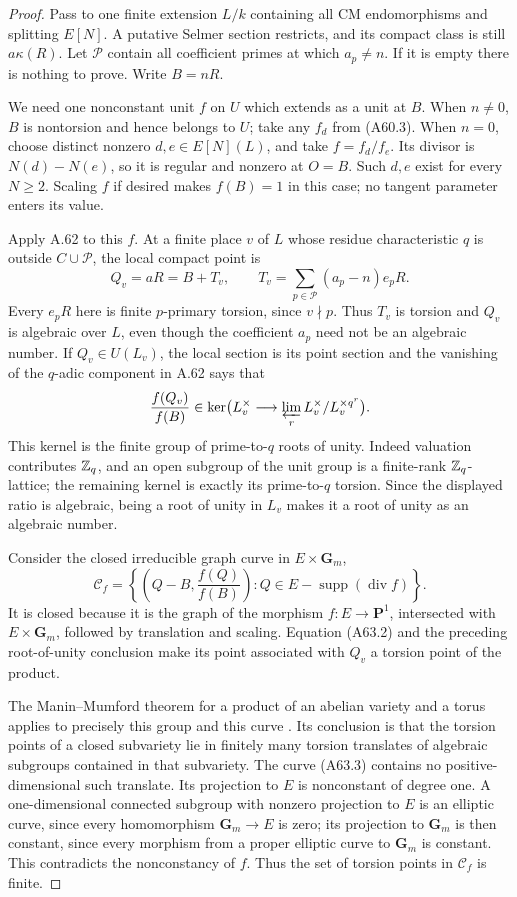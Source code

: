 \begin{proof}
Pass to one finite extension $L/k$ containing all CM
endomorphisms and splitting $E[N]$. A putative Selmer section
restricts, and its compact class is still $a\kappa(R)$.
Let $\mathcal P$ contain all coefficient primes at which
$a_p\ne n$. If it is empty there is nothing to prove.
Write $B=nR$.

We need one nonconstant unit $f$ on $U$ which extends as a unit
at $B$. When $n\ne0$, $B$ is nontorsion and hence belongs to
$U$; take any $f_d$ from (A60.3). When $n=0$, choose distinct
nonzero $d,e\in E[N](L)$, and take $f=f_d/f_e$.
Its divisor is $N(d)-N(e)$, so it is regular and nonzero at
$O=B$. Such $d,e$ exist for every $N\ge2$. Scaling $f$ if
desired makes $f(B)=1$ in this case; no tangent parameter enters
its value.

Apply A.62 to this $f$. At a finite place $v$ of $L$ whose
residue characteristic $q$ is outside $C\cup\mathcal P$, the
local compact point is
\[
 Q_v=aR=B+T_v,\qquad
 T_v=\sum_{p\in\mathcal P}(a_p-n)e_pR.
 \tag{A63.2}
\]
Every $e_pR$ here is finite $p$-primary torsion, since $v\nmid p$.
Thus $T_v$ is torsion and $Q_v$ is algebraic over $L$, even
though the coefficient $a_p$ need not be an algebraic number.
If $Q_v\in U(L_v)$, the local section is its point section and
the vanishing of the $q$-adic component in A.62 says that
\[
 \frac{f(Q_v)}{f(B)}\in
 \ker\bigl(L_v^\times\longrightarrow
                  \varprojlim_rL_v^\times/L_v^{\times q^r}\bigr).
\]
This kernel is the finite group of prime-to-$q$ roots of unity.
Indeed valuation contributes $\mathbb Z_q$, and an open subgroup of
the unit group is a finite-rank $\mathbb Z_q$-lattice; the remaining
kernel is exactly its prime-to-$q$ torsion. Since the displayed
ratio is algebraic, being a root of unity in $L_v$ makes it a
root of unity as an algebraic number.

Consider the closed irreducible graph curve in
$E\times\mathbf G_m$,
\[
 \mathcal C_f=
 \left\{\left(Q-B,\frac{f(Q)}{f(B)}\right):
             Q\in E-\operatorname{supp}(\operatorname{div}f)\right\}.
 \tag{A63.3}
\]
It is closed because it is the graph of the morphism
$f:E\to\mathbf P^1$, intersected with
$E\times\mathbf G_m$, followed by translation and scaling.
Equation (A63.2) and the preceding root-of-unity conclusion make
its point associated with $Q_v$ a torsion point of the product.

The Manin--Mumford theorem for a product of an abelian variety
and a torus applies to precisely this group and this curve
\citep[Theorem~1, \S4, p.~587]{AMHindry1988}. Its conclusion is
that the torsion points of a closed subvariety lie in finitely
many torsion translates of algebraic subgroups contained in
that subvariety. The curve (A63.3) contains no positive-dimensional
such translate. Its projection to $E$ is nonconstant of degree
one. A one-dimensional connected subgroup with nonzero
projection to $E$ is an elliptic curve, since every homomorphism
$\mathbf G_m\to E$ is zero; its projection to $\mathbf G_m$
is then constant, since every morphism from a proper elliptic
curve to $\mathbf G_m$ is constant. This contradicts the
nonconstancy of $f$. Thus the set of torsion points in
$\mathcal C_f$ is finite.


\end{proof}
